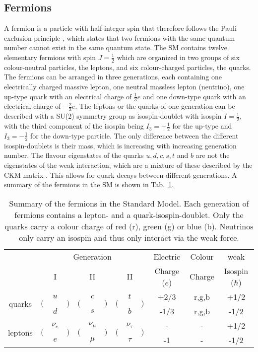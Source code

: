 \subsection{Fermions}
A fermion is a particle with half-integer spin that therefore follows the Pauli exclusion principle \cite{pauli}, which states that two fermions with the same quantum number cannot exist in the same quantum state. The SM contains twelve elementary fermions with spin $J=\frac{1}{2}$ which are organized in two groups of six colour-neutral particles, the leptons, and six colour-charged particles, the quarks. The fermions can be arranged in three generations, each containing one electrically charged massive lepton, one neutral massless lepton (neutrino), one up-type quark with an electrical charge of $\frac{1}{3}e$ and one down-type quark with an electrical charge of $-\frac{2}{3}e$. The leptons or the quarks of one generation can be described with a SU(2) symmetry group as isospin-doublet with isospin $I=\frac{1}{2}$, with the third component of the isospin being $I_3=+\frac{1}{2}$ for the up-type and $I_3=-\frac{1}{2}$ for the down-type particle. The only difference between the different isospin-doublets is their mass, which is increasing with increasing generation number. The flavour eigenstates of the quarks $u,d,c,s,t$ and $b$ are not the eigenstates of the weak interaction, which are a mixture of these described by the CKM-matrix \cite{CKM}. This allows for quark decays between different generations. 
A summary of the fermions in the SM is shown in Tab.~\ref{tab:theo:fermions}.\\
\begin{table}[]
	\centering
	\caption[Summary of the fermions in the Standard Model]{Summary of the fermions in the Standard Model. Each generation of fermions contains a lepton- and a quark-isospin-doublet. Only the quarks carry a colour charge of red (r), green (g) or blue (b). Neutrinos only carry an isospin and thus only interact via the weak force.}
	\label{tab:theo:fermions}
	\begin{tabular}{crclrclrclccc}
	\hline
	& \multicolumn{9}{c}{Generation} & Electric & Colour &  weak \\
	& \multicolumn{3}{c}{I} & \multicolumn{3}{c}{II} & \multicolumn{3}{c}{II} & Charge ($e$) & Charge &  Isospin ($\hbar$) \\
	\hline
	\multirow{2}{*}{quarks} & \multirow{2}{*}{$\Big($} & $u$ & \multirow{2}{*}{$\Big)$} & \multirow{2}{*}{$\Big($} & $c$ & \multirow{2}{*}{$\Big)$} & \multirow{2}{*}{$\Big($} & $t$ & \multirow{2}{*}{$\Big)$} & +2/3 & r,g,b & +1/2 \\  
	 & & $d$ & & & $s$ & & & $b$ & & -1/3 & r,g,b & -1/2 \\ 
	\multirow{2}{*}{leptons}& \multirow{2}{*}{$\Big($} & $\nu_e$ & \multirow{2}{*}{$\Big)$} & \multirow{2}{*}{$\Big($} & $\nu_\mu$ & \multirow{2}{*}{$\Big)$} & \multirow{2}{*}{$\Big($} & $\nu_\tau$ & \multirow{2}{*}{$\Big)$} & - & - & +1/2 \\ 
	 & & $e$ & & & $\mu$ & & & $\tau$ & & -1 & - & -1/2 \\
	\hline
	\end{tabular}
\end{table}


